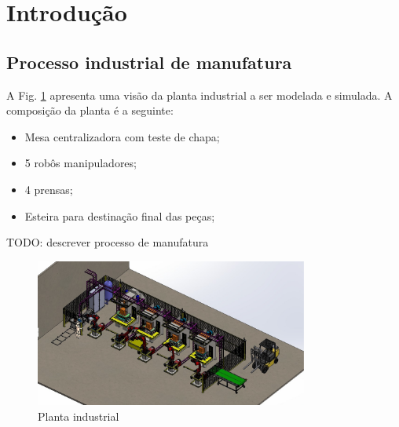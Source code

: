 \section{Introdução}

\subsection{Processo industrial de manufatura}
A Fig. \ref{fig:processo} apresenta uma visão da planta industrial a ser modelada e simulada.
A composição da planta é a seguinte:
\begin{itemize}
    \item Mesa centralizadora com teste de chapa;
    \item 5 robôs manipuladores;
    \item 4 prensas;
    \item Esteira para destinação final das peças;
\end{itemize}

TODO: descrever processo de manufatura

\begin{figure}[H]%
    \centering
    \includegraphics[width=0.8\textwidth]{imagens/processo.eps}
    \caption{Planta industrial}\label{fig:processo}
\end{figure}
